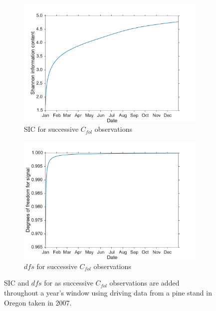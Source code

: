 \begin{figure}[ht]
    \centering
    \begin{subfigure}[b]{0.45\textwidth}
        \includegraphics[width=\textwidth]{chapter/chapter5/sic_succ_cf.pdf}
        \caption{SIC for successive \(C_{fol}\) observations}
        \label{chap5:fig:sic_succ_cf}
    \end{subfigure}%
    \begin{subfigure}[b]{0.45\textwidth}
        \includegraphics[width=\textwidth]{chapter/chapter5/dfs_succ_cf.pdf}
        \caption{\(dfs\) for successive \(C_{fol}\) observations}
        \label{chap5:fig:dfs_succ_cf}
    \end{subfigure}
    \caption{SIC and \(dfs\) for as successive \(C_{fol}\) observations are added throughout a year's window using driving data from a pine stand in Oregon taken in 2007.}
    \label{chap5:fig:ic_succ_cf}
\end{figure}

